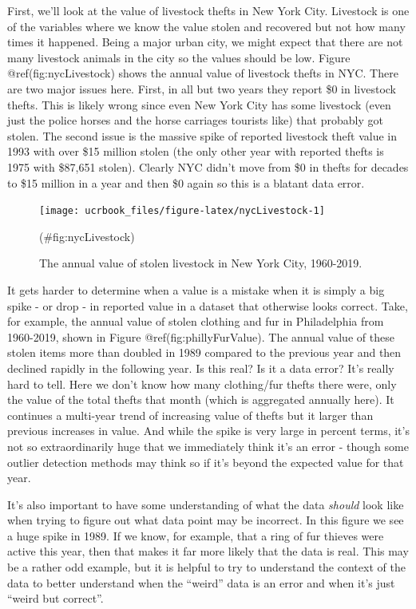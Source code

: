 \documentclass[
  12pt,
  openany]{book}
\begin{document}
First, we'll look at the value of livestock thefts in New York City. Livestock is one of the variables where we know the value stolen and recovered but not how many times it happened. Being a major urban city, we might expect that there are not many livestock animals in the city so the values should be low. Figure @ref(fig:nycLivestock) shows the annual value of livestock thefts in NYC. There are two major issues here. First, in all but two years they report \$0 in livestock thefts. This is likely wrong since even New York City has some livestock (even just the police horses and the horse carriages tourists like) that probably got stolen. The second issue is the massive spike of reported livestock theft value in 1993 with over \$15 million stolen (the only other year with reported thefts is 1975 with \$87,651 stolen). Clearly NYC didn't move from \$0 in thefts for decades to \$15 million in a year and then \$0 again so this is a blatant data error.

\begin{figure}

{\centering \texttt{[image: ucrbook\_files/figure-latex/nycLivestock-1]} 

}

\caption{The annual value of stolen livestock in New York City, 1960-2019.}(\#fig:nycLivestock)
\end{figure}

It gets harder to determine when a value is a mistake when it is simply a big spike - or drop - in reported value in a dataset that otherwise looks correct. Take, for example, the annual value of stolen clothing and fur in Philadelphia from 1960-2019, shown in Figure @ref(fig:phillyFurValue). The annual value of these stolen items more than doubled in 1989 compared to the previous year and then declined rapidly in the following year. Is this real? Is it a data error? It's really hard to tell. Here we don't know how many clothing/fur thefts there were, only the value of the total thefts that month (which is aggregated annually here). It continues a multi-year trend of increasing value of thefts but it larger than previous increases in value. And while the spike is very large in percent terms, it's not so extraordinarily huge that we immediately think it's an error - though some outlier detection methods may think so if it's beyond the expected value for that year.

It's also important to have some understanding of what the data \emph{should} look like when trying to figure out what data point may be incorrect. In this figure we see a huge spike in 1989. If we know, for example, that a ring of fur thieves were active this year, then that makes it far more likely that the data is real. This may be a rather odd example, but it is helpful to try to understand the context of the data to better understand when the ``weird'' data is an error and when it's just ``weird but correct''.
\end{document}
